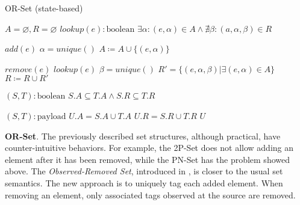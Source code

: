 \begin{algorithm}[t]
\small{
	\caption{OR-Set (state-based)}
 	\label{alg:or_set_state_based}                       

 	\begin{algorithmic}[1]
 	  \State \Payload $A = \varnothing, R = \varnothing$
 	  \State \Query $lookup(e) : \text{boolean}$
 	  \State \hspace{\algorithmicindent} \Return $\exists \alpha : (e, \alpha) \in A \land \nexists \beta : (a, \alpha, \beta) \in R$
 	  
 	  \State \Update $add(e)$
 	  \State \hspace{\algorithmicindent} \Let $\alpha = unique()$
 	  \State \hspace{\algorithmicindent} $A \coloneqq A \cup \{(e, \alpha)\}$
 	  
 	  \State \Update $remove(e)$
 	  \State \hspace{\algorithmicindent} \Pre $lookup(e)$
 	  \State \hspace{\algorithmicindent} \Let $\beta = unique()$
 	  \State \hspace{\algorithmicindent} \Let $R' = \{(e, \alpha, \beta) | \exists (e, \alpha) \in A\}$
 	  \State \hspace{\algorithmicindent} $R \coloneqq R \cup R'$
 	  
 	  \State \Compare $(S, T) : \text{boolean}$
 	  \State \hspace{\algorithmicindent} \Return $S.A \subseteq T.A \land S.R \subseteq T.R$ 
 	  
 	  \State \Merge $(S, T) : \text{payload}$
 	  \State \hspace{\algorithmicindent} \Let $U.A = S.A \cup T.A$
 	  \State \hspace{\algorithmicindent} \Let $U.R = S.R \cup T.R$
 	  \State \hspace{\algorithmicindent} \Return $U$
	\end{algorithmic}
 }
\end{algorithm}

\textbf{OR-Set}. The previously described set structures, although practical,
have counter-intuitive behaviors. For example, the 2P-Set does not allow adding
an element after it has been removed, while the PN-Set has the problem showed
above. The \textit{Observed-Removed Set}, introduced in
\cite{preguica:inria-00445758}, is closer to the usual set semantics. The new
approach is to uniquely tag each added element. When removing an element, only
associated tags observed at the source are removed. 


